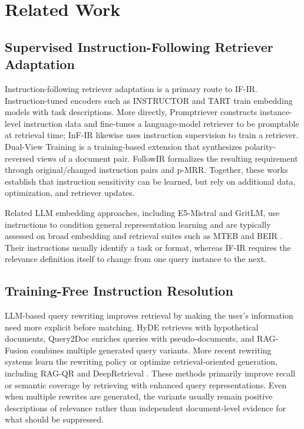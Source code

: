 \documentclass[letterpaper]{article}
\begin{document}
\section{Related Work}
\label{sec:related-work}

\subsection{Supervised Instruction-Following Retriever Adaptation}

Instruction-following retriever adaptation is a primary route to IF-IR.
Instruction-tuned encoders such as INSTRUCTOR \cite{instructor2022} and
TART \cite{tart2022} train embedding models with task descriptions.
More directly, Promptriever \cite{weller2024promptriever} constructs
instance-level instruction data and fine-tunes a language-model retriever
to be promptable at retrieval time; InF-IR \cite{zhuang2025infir}
likewise uses instruction supervision to train a retriever.  Dual-View
Training \cite{dualview2026} is a training-based extension that
synthesizes polarity-reversed views of a document pair.  FollowIR
\cite{weller-etal-2025-followir} formalizes the resulting requirement
through original/changed instruction pairs and p-MRR.  Together, these
works establish that instruction sensitivity can be learned, but rely on
additional data, optimization, and retriever updates.

Related LLM embedding approaches, including E5-Mistral and GritLM,
use instructions to condition general representation learning and are
typically assessed on broad embedding and retrieval suites such as MTEB
and BEIR \cite{e5mistral2023,gritlm2024,mteb2022,beir2021}.  Their
instructions usually identify a task or format, whereas IF-IR requires
the relevance definition itself to change from one query instance to the
next.

\subsection{Training-Free Instruction Resolution}

LLM-based query rewriting improves retrieval by making the user's
information need more explicit before matching.  HyDE
\cite{gao2023hyde} retrieves with hypothetical documents, Query2Doc
\cite{wang2023query2doc} enriches queries with pseudo-documents, and
RAG-Fusion \cite{raudaschl2024ragfusion} combines multiple generated
query variants.  More recent rewriting systems learn the rewriting
policy or optimize retrieval-oriented generation, including RAG-QR
\cite{ma2023ragqr} and DeepRetrieval
\cite{li2025deepretrieval}.  These methods primarily improve recall or
semantic coverage by retrieving with enhanced query representations.
Even when multiple rewrites are generated, the variants usually remain
positive descriptions of relevance rather than independent
document-level evidence for what should be suppressed.
\end{document}
